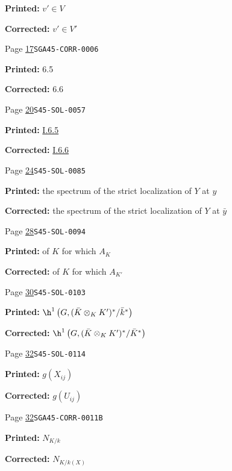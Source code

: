 \begin{description}
\par\noindent\textbf{Printed:} \(v'\in V\)
\par\noindent\textbf{Corrected:} \(v'\in V'\)
\smallskip
\item[\hypertarget{apparatus:EN-0007}{7}] Page \hyperlink{printpage:en:17}{17}\quad\texttt{SGA45-CORR-0006}
\par\noindent\textbf{Printed:} 6.5
\par\noindent\textbf{Corrected:} 6.6
\smallskip
\item[\hypertarget{apparatus:EN-0008}{8}] Page \hyperlink{printpage:en:20}{20}\quad\texttt{S45-SOL-0057}
\par\noindent\textbf{Printed:} \hyperref[I:1-6-6]{I.6.5}
\par\noindent\textbf{Corrected:} \hyperref[I:1-6-6]{I.6.6}
\smallskip
\item[\hypertarget{apparatus:EN-0009}{9}] Page \hyperlink{printpage:en:24}{24}\quad\texttt{S45-SOL-0085}
\par\noindent\textbf{Printed:} the spectrum of the strict localization of $Y$ at $y$
\par\noindent\textbf{Corrected:} the spectrum of the strict localization of $Y$ at $\bar y$
\smallskip
\item[\hypertarget{apparatus:EN-0010}{10}] Page \hyperlink{printpage:en:28}{28}\quad\texttt{S45-SOL-0094}
\par\noindent\textbf{Printed:} of $K$ for which $A_K$
\par\noindent\textbf{Corrected:} of $K$ for which $A_{K'}$
\smallskip
\item[\hypertarget{apparatus:EN-0011}{11}] Page \hyperlink{printpage:en:30}{30}\quad\texttt{S45-SOL-0103}
\par\noindent\textbf{Printed:} \(\h^1\left(G,(\bar K\otimes_K K')^*/\bar k^*\right)\)
\par\noindent\textbf{Corrected:} \(\h^1\left(G,(\bar K\otimes_K K')^*/\bar K^*\right)\)
\smallskip
\item[\hypertarget{apparatus:EN-0012}{12}] Page \hyperlink{printpage:en:32}{32}\quad\texttt{S45-SOL-0114}
\par\noindent\textbf{Printed:} \(g(X_{ij})\)
\par\noindent\textbf{Corrected:} \(g(U_{ij})\)
\smallskip
\item[\hypertarget{apparatus:EN-0013}{13}] Page \hyperlink{printpage:en:32}{32}\quad\texttt{SGA45-CORR-0011B}
\par\noindent\textbf{Printed:} \(N_{K/k}\)
\par\noindent\textbf{Corrected:} \(N_{K/k(X)}\)

\end{description}
